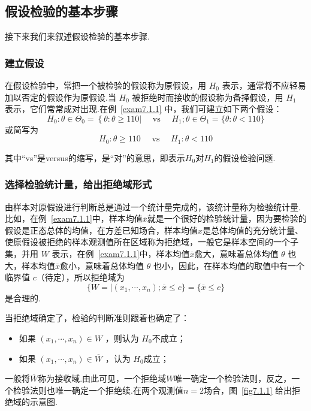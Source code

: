 \subsection{假设检验的基本步骤\label{7.1.2}}
接下来我们来叙述假设检验的基本步骤.

\subsubsection{建立假设}

在假设检验中，常把一个被检验的假设称为原假设，用 $H_{0}$ 表示，通常将不应轻易加以否定的假设作为原假设.当 $H_{0}$ 被拒绝时而接收的假设称为备择假设，用 $H_{1}$ 表示，它们常常成对出现.在例~\ref{exam7.1.1} 中，我们可建立如下两个假设：
\[H _ { 0 } : \theta \in \Theta _ { 0 } = \left\{ \theta : \theta \geq 110 | \quad \text { vs } \quad H _ { 1 } ; \theta \in \Theta _ { 1 } = \{ \theta : \theta < 110 \}\right.\]
或简写为
\[H _ { 0 } : \theta \geq 110 \quad \text { vs } \quad H _ { 1 } : \theta < 110\]

其中“vs”是versus的缩写，是“对”的意思，即表示$H_{0}$对$H_{1}$的假设检验问题.

\subsubsection{选择检验统计量，给出拒绝域形式}

由样本对原假设进行判断总是通过一个统计量完成的，该统计量称为检验统计量.比如，在例~\ref{exam7.1.1}中，样本均值$\overline{x}$就是一个很好的检验统计量，因为要检验的假设是正态总体的均值，在方差已知场合，样本均值$x$是总体均值的充分统计量、使原假设被拒绝的样本观测值所在区域称为拒绝域，一般它是样本空间的一个子集，并用 $W$ 表示，在例~\ref{exam7.1.1}中，样本均值$\overline{x}$愈大，意味着总体均值 $\theta$ 也大，样本均值$\overline{x}$愈小，意味着总体均值 $\theta$ 也小，因此，在样本均值的取值中有一个临界值 $c$（待定），所以拒绝域为
\[\{W = | \left( x _ { 1 } , \cdots , x _ { n } \right) ; \overline { x } \leq c \} = \{ \overline { x } \leq c \}\]
是合理的.

当拒绝域确定了，检验的判断准则跟着也确定了：
\begin{itemize}
	\item 如果 $\left( x _ { 1 } , \cdots , x _ { n } \right) \in W$ ，则认为 $H_{0}$不成立；
	\item 如果 $\left( x _ { 1 } , \cdots , x _ { n } \right) \in \overline { W }$ ，认为 $H_{0}$成立；
\end{itemize}

一般将$\overline{W}$称为接收域.由此可见，一个拒绝域$W$唯一确定一个检验法则，反之，一个检验法则也唯一确定一个拒绝续.在两个观测值$n=2$场合，图~\ref{fig7.1.1} 给出拒绝域的示意图.

